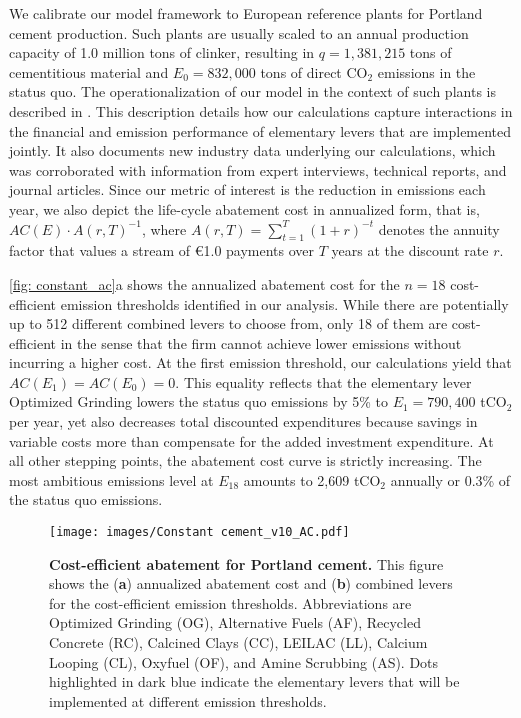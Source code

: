 \documentclass[12pt, a4paper]{article} %
\newcommand{\methods}{\nameref{sec: methods}} %
\begin{document}
We calibrate our model framework to European reference plants for Portland cement production. Such plants are usually scaled to an annual production capacity of 1.0 million tons of clinker, resulting in $q = 1,381,215$ tons of cementitious material and $E_0 = 832,000$ tons of direct CO$_2$ emissions in the status quo. The operationalization of our model in the context of such plants is described in \methods. This description details how our calculations capture interactions in the financial and emission performance of elementary levers that are implemented jointly. It also documents new industry data \citep{ecra2022state} underlying our calculations, which was corroborated with information from expert interviews, technical reports, and journal articles. Since our metric of interest is the reduction in emissions each year, we also depict the life-cycle abatement cost in annualized form, that is, $AC(E) \cdot A(r,T)^{-1}$, where $A(r,T) = \sum_{t=1}^{T} (1+r)^{-t}$ denotes the annuity factor that values a stream of \euro 1.0 payments over $T$ years at the discount rate $r$.

\autoref{fig: constant_ac}a shows the annualized abatement cost for the $n = 18$ cost-efficient emission thresholds identified in our analysis. While there are potentially up to 512 different combined levers to choose from, only 18 of them are cost-efficient in the sense that the firm cannot achieve lower emissions without incurring a higher cost. At the first emission threshold, our calculations yield that $AC(E_1) = AC(E_0) = 0$. This equality reflects that the elementary lever Optimized Grinding lowers the status quo emissions by 5\% to $E_1 = 790,400$ tCO$_2$ per year, yet also decreases total discounted expenditures because savings in variable costs more than compensate for the added investment expenditure. At all other stepping points, the abatement cost curve is strictly increasing. The most ambitious emissions level at $E_{18}$ amounts to 2,609 tCO$_2$ annually or 0.3\% of the status quo emissions.

\begin{figure}[ht]
\centering
\texttt{[image: images/Constant cement\_v10\_AC.pdf]}
\caption{\textbf{Cost-efficient abatement for Portland cement.} This figure shows the (\textbf{a}) annualized abatement cost and (\textbf{b}) combined levers for the cost-efficient emission thresholds. Abbreviations are Optimized Grinding (OG), Alternative Fuels (AF), Recycled Concrete (RC), Calcined Clays (CC), LEILAC (LL), Calcium Looping (CL), Oxyfuel (OF), and Amine Scrubbing (AS). Dots highlighted in dark blue indicate the elementary levers that will be implemented at different emission thresholds.}
\label{fig: constant_ac}
\end{figure}
\end{document}
